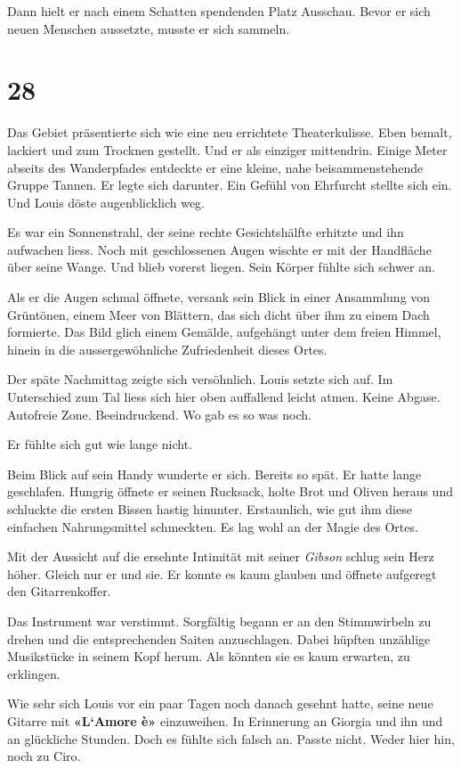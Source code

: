 Dann hielt er nach einem Schatten spendenden Platz Ausschau. Bevor er
sich neuen Menschen aussetzte, musste er sich sammeln.

\chapter{28}\label{section-27}

Das Gebiet präsentierte sich wie eine neu errichtete Theaterkulisse.
Eben bemalt, lackiert und zum Trocknen gestellt. Und er als einziger
mittendrin. Einige Meter abseits des Wanderpfades entdeckte er eine
kleine, nahe beisammenstehende Gruppe Tannen. Er legte sich darunter.
Ein Gefühl von Ehrfurcht stellte sich ein. Und Louis döste
augenblicklich weg.

Es war ein Sonnenstrahl, der seine rechte Gesichtshälfte erhitzte und
ihn aufwachen liess. Noch mit geschlossenen Augen wischte er mit der
Handfläche über seine Wange. Und blieb vorerst liegen. Sein Körper
fühlte sich schwer an.

Als er die Augen schmal öffnete, versank sein Blick in einer Ansammlung
von Grüntönen, einem Meer von Blättern, das sich dicht über ihm zu einem
Dach formierte. Das Bild glich einem Gemälde, aufgehängt unter dem
freien Himmel, hinein in die aussergewöhnliche Zufriedenheit dieses
Ortes.

Der späte Nachmittag zeigte sich versöhnlich. Louis setzte sich auf. Im
Unterschied zum Tal liess sich hier oben auffallend leicht atmen. Keine
Abgase. Autofreie Zone. Beeindruckend. Wo gab es so was noch.

Er fühlte sich gut wie lange nicht.

Beim Blick auf sein Handy wunderte er sich. Bereits so spät. Er hatte
lange geschlafen. Hungrig öffnete er seinen Rucksack, holte Brot und
Oliven heraus und schluckte die ersten Bissen hastig hinunter.
Erstaunlich, wie gut ihm diese einfachen Nahrungsmittel schmeckten. Es
lag wohl an der Magie des Ortes.

Mit der Aussicht auf die ersehnte Intimität mit seiner \emph{Gibson}
schlug sein Herz höher. Gleich nur er und sie. Er konnte es kaum glauben
und öffnete aufgeregt den Gitarrenkoffer.

Das Instrument war verstimmt. Sorgfältig begann er an den Stimmwirbeln
zu drehen und die entsprechenden Saiten anzuschlagen. Dabei hüpften
unzählige Musikstücke in seinem Kopf herum. Als könnten sie es kaum
erwarten, zu erklingen.

Wie sehr sich Louis vor ein paar Tagen noch danach gesehnt hatte, seine
neue Gitarre mit \textbf{«L`Amore è»} einzuweihen. In Erinnerung an
Giorgia und ihn und an glückliche Stunden. Doch es fühlte sich falsch
an. Passte nicht. Weder hier hin, noch zu Ciro.


